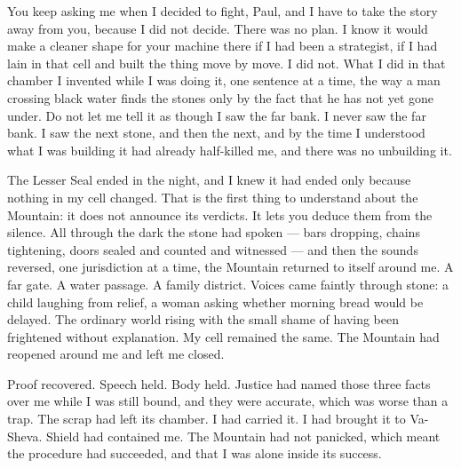  
\noindent You keep asking me when I decided to fight, Paul, and I have to take the story away from you, because I did not decide. There was no plan. I know it would make a cleaner shape for your machine there if I had been a strategist, if I had lain in that cell and built the thing move by move. I did not. What I did in that chamber I invented while I was doing it, one sentence at a time, the way a man crossing black water finds the stones only by the fact that he has not yet gone under. Do not let me tell it as though I saw the far bank. I never saw the far bank. I saw the next stone, and then the next, and by the time I understood what I was building it had already half-killed me, and there was no unbuilding it.\par
 
\ornament
 
The Lesser Seal ended in the night, and I knew it had ended only because nothing in my cell changed. That is the first thing to understand about the Mountain: it does not announce its verdicts. It lets you deduce them from the silence. All through the dark the stone had spoken — bars dropping, chains tightening, doors sealed and counted and witnessed — and then the sounds reversed, one jurisdiction at a time, the Mountain returned to itself around me. A far gate. A water passage. A family district. Voices came faintly through stone: a child laughing from relief, a woman asking whether morning bread would be delayed. The ordinary world rising with the small shame of having been frightened without explanation. My cell remained the same. The Mountain had reopened around me and left me closed.\par
 
Proof recovered. Speech held. Body held. Justice had named those three facts over me while I was still bound, and they were accurate, which was worse than a trap. The scrap had left its chamber. I had carried it. I had brought it to Va-Sheva. Shield had contained me. The Mountain had not panicked, which meant the procedure had succeeded, and that I was alone inside its success.\par
 
